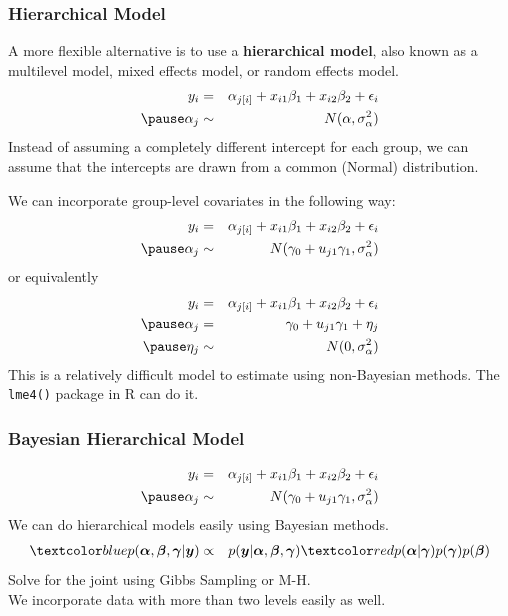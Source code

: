 \documentclass{beamer}
\begin{document}
\begin{frame}
\frametitle{Hierarchical Model}
\pause
A more flexible alternative is to use a {\bf hierarchical model}, also
known as a multilevel model, mixed effects model, or random effects model.
\pause
\begin{eqnarray*}
y_i &=& \alpha_{j[i]} +  x_{i1} \beta_1 + x_{i2} \beta_2 + \epsilon_i\\
\pause
\alpha_{j} &\sim& N(\alpha, \sigma^2_{\alpha}) \\
\end{eqnarray*}
\pause
Instead of assuming a completely different intercept for each group,
we can assume that the intercepts are drawn from a common (Normal) distribution.
\end{frame}

\begin{frame}
We can incorporate group-level covariates in the following way:
\pause
\begin{eqnarray*}
y_i &=& \alpha_{j[i]} +  x_{i1} \beta_1 + x_{i2} \beta_2 + \epsilon_i\\
\pause
\alpha_{j} &\sim& N(\gamma_0 + u_{j1} \gamma_1, \sigma^2_{\alpha}) \\
\end{eqnarray*}
\pause
or equivalently
\pause 
\begin{eqnarray*}
y_i &=& \alpha_{j[i]} +  x_{i1} \beta_1 + x_{i2} \beta_2 + \epsilon_i\\
\pause
\alpha_{j} &=& \gamma_0 + u_{j1} \gamma_1 + \eta_j \\
\pause
\eta_j &\sim& N(0, \sigma^2_{\alpha}) \\
\end{eqnarray*}
\pause
This is a relatively difficult model to estimate using non-Bayesian
methods.  The {\tt lme4()} package in R can do it.
\end{frame}

\begin{frame}
\frametitle{Bayesian Hierarchical Model}
\pause
\begin{eqnarray*}
y_i &=& \alpha_{j[i]} +  x_{i1} \beta_1 + x_{i2} \beta_2 + \epsilon_i\\
\pause
\alpha_{j} &\sim& N(\gamma_0 + u_{j1} \gamma_1, \sigma^2_{\alpha}) \\
\end{eqnarray*}
\pause
We can do hierarchical models easily using Bayesian methods.
\pause
\begin{eqnarray*}
\blue{p(\bm{\alpha}, \bm{\beta}, \bm{\gamma}|\bm{y})} &\propto& p(\bm{y}
| \bm{\alpha}, \bm{\beta}, \bm{\gamma})
\red{p(\bm{\alpha}|\bm{\gamma}) p(\bm{\gamma}) p(\bm{\beta})} \\
\end{eqnarray*}
\pause
Solve for the joint  using Gibbs Sampling or M-H. \\
\pause
\bigskip
We incorporate data with more than two levels easily as well.
\end{frame}
\end{document}
